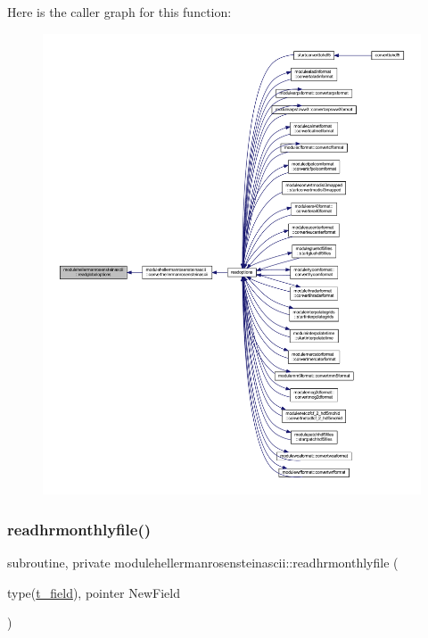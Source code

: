 Here is the caller graph for this function\+:\nopagebreak
\begin{figure}[H]
\begin{center}
\leavevmode
\includegraphics[width=350pt]{namespacemodulehellermanrosensteinascii_af439206d121534b62861ec79a514b301_icgraph}
\end{center}
\end{figure}
\mbox{\label{namespacemodulehellermanrosensteinascii_a8a33a7b75c9d86b3447e0ab4f459e1c9}} 
\subsubsection{\texorpdfstring{readhrmonthlyfile()}{readhrmonthlyfile()}}
{\footnotesize\ttfamily subroutine, private modulehellermanrosensteinascii\+::readhrmonthlyfile (\begin{DoxyParamCaption}\item[{type(\mbox{\hyperlink{structmodulehellermanrosensteinascii_1_1t__field}{t\+\_\+field}}), pointer}]{New\+Field }\end{DoxyParamCaption})\hspace{0.3cm}{\ttfamily [private]}}

